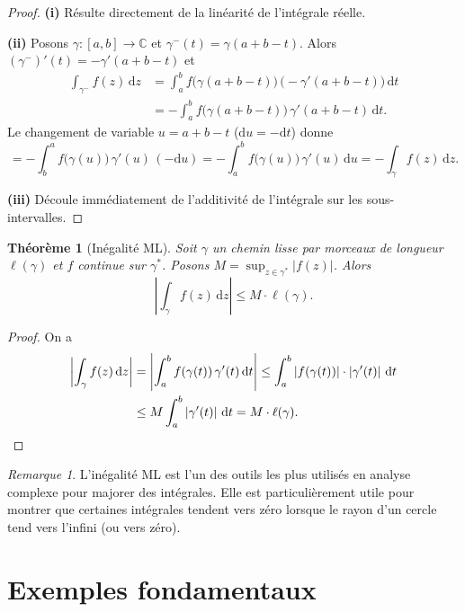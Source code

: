 \documentclass[12pt,a4paper,openany]{book}
\theoremstyle{definition}
\theoremstyle{plain}
\newtheorem{theoreme}[definition]{Théorème}
\theoremstyle{remark}
\newtheorem{remarque}[definition]{Remarque}
\newcommand{\C}{\mathbb{C}}
\newcommand{\dd}{\mathrm{d}}
\newcommand{\abs}[1]{\left|#1\right|}
\begin{document}
\begin{proof}
\textbf{(i)} Résulte directement de la linéarité de l'intégrale réelle.

\textbf{(ii)} Posons $\gamma \colon [a,b] \to \C$ et $\gamma^-(t) =
\gamma(a+b-t)$. Alors $(\gamma^-)'(t) = -\gamma'(a+b-t)$ et
\begin{align*}
  \int_{\gamma^-} f(z)\,\dd z
  &= \int_a^b f\bigl(\gamma(a+b-t)\bigr)\,\bigl(-\gamma'(a+b-t)\bigr)\,\dd t \\
  &= -\int_a^b f\bigl(\gamma(a+b-t)\bigr)\,\gamma'(a+b-t)\,\dd t.
\end{align*}
Le changement de variable $u = a+b-t$ ($\dd u = -\dd t$) donne
\[
  = -\int_b^a f\bigl(\gamma(u)\bigr)\,\gamma'(u)\,(-\dd u)
  = -\int_a^b f\bigl(\gamma(u)\bigr)\,\gamma'(u)\,\dd u
  = -\int_\gamma f(z)\,\dd z.
\]

\textbf{(iii)} Découle immédiatement de l'additivité de l'intégrale sur les
sous-intervalles.
\end{proof}

\begin{theoreme}[Inégalité ML]\label{thm:inegalite-ML}
Soit $\gamma$ un chemin lisse par morceaux de longueur $\ell(\gamma)$ et
$f$ continue sur $\gamma^*$. Posons $M = \sup_{z \in \gamma^*} \abs{f(z)}$.
Alors
\[
  \abs{\int_\gamma f(z)\,\dd z} \leq M \cdot \ell(\gamma).
\]
\end{theoreme}

\begin{proof}
On a
\begin{align*}
  \abs{\int_\gamma f(z)\,\dd z}
  &= \abs{\int_a^b f(\gamma(t))\,\gamma'(t)\,\dd t}
  \leq \int_a^b \abs{f(\gamma(t))} \cdot \abs{\gamma'(t)} \, \dd t \\
  &\leq M \int_a^b \abs{\gamma'(t)} \, \dd t
  = M \cdot \ell(\gamma). \qedhere
\end{align*}
\end{proof}

\begin{remarque}\label{rem:ML-utile}
L'inégalité ML est l'un des outils les plus utilisés en analyse complexe pour
majorer des intégrales. Elle est particulièrement utile pour montrer que
certaines intégrales tendent vers zéro lorsque le rayon d'un cercle tend
vers l'infini (ou vers zéro).
\end{remarque}

\section{Exemples fondamentaux}\label{sec:exemples-fondamentaux}
\end{document}
